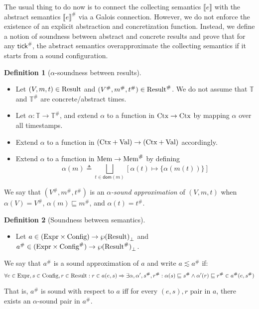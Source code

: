 \documentclass{article}
\theoremstyle{definition}
\newtheorem{definition}{Definition}[section]
\newcommand*{\A}[1]{{#1}^{\#}}
\newcommand*{\Expr}{\text{Expr}}
\newcommand*{\Time}{\mathbb{T}}
\newcommand*{\ATime}{\A{\Time}}
\newcommand*{\Ctx}[1]{\text{Ctx}\vphantom{#1}}
\newcommand*{\Value}[1]{\text{Val}\vphantom{#1}}
\newcommand*{\Mem}[1]{\text{Mem}\vphantom{#1}}
\newcommand*{\mem}{m}
\newcommand*{\AMem}[1]{\A{\text{Mem}}\vphantom{#1}}
\newcommand*{\Config}[1]{\text{Config}\vphantom{#1}}
\newcommand*{\AConfig}[1]{\A{\text{Config}}\vphantom{#1}}
\newcommand*{\Result}[1]{\text{Result}\vphantom{#1}}
\newcommand*{\AResult}[1]{\A{\text{Result}}\vphantom{#1}}
\newcommand*{\sembracket}[1]{\lBrack{#1}\rBrack}
\newcommand*{\tick}{\mathsf{tick}}
\begin{document}
The usual thing to do now is to connect the collecting semantics $\sembracket{e}$ with the abstract semantics $\A{\sembracket{e}}$ via a Galois connection.
However, we do not enforce the existence of an explicit abstraction and concretization function.
Instead, we define a notion of soundness between abstract and concrete results and prove that for any $\A{\tick}$, the abstract semantics overapproximate the collecting semantics if it starts from a sound configuration.

\begin{definition}[$\alpha$-soundness between results]
  $\:$

  \begin{itemize}
    \item Let $(V,\mem,t)\in\Result{\Time}$ and $(\A{V},\A\mem,\A{t})\in\AResult{\ATime}$. We do not assume that $\Time$ and $\ATime$ are concrete/abstract times.
    \item Let $\alpha:\Time\rightarrow\ATime$, and extend $\alpha$ to a function in $\Ctx{\Time}\rightarrow\Ctx{\ATime}$ by mapping $\alpha$ over all timestamps.
    \item Extend $\alpha$ to a function in $(\Ctx{\Time}+\Value{\Time})\rightarrow(\Ctx{\ATime}+\Value{\ATime})$ accordingly.
    \item Extend $\alpha$ to a function in $\Mem{\Time}\rightarrow\AMem{\ATime}$ by defining
          \[\alpha(\mem)\triangleq\bigsqcup_{t\in\mathsf{dom}(\mem)}[\alpha(t)\mapsto\{\alpha(\mem(t))\}]\]
  \end{itemize}

  We say that $(\A{V},\A\mem,\A{t})$ is an \emph{$\alpha$-sound approximation} of $(V,\mem,t)$ when $\alpha(V)=\A{V}$, $\alpha(\mem)\sqsubseteq\A\mem$, and $\alpha(t)=\A{t}$.
\end{definition}

\begin{definition}[Soundness between semantics]
  $\:$

  \begin{itemize}
    \item Let $a\in(\Expr\times\Config{\Time})\rightarrow{\wp(\Result{\Time})}_{\bot}$ and $\A{a}\in(\Expr\times\AConfig{\ATime})\rightarrow{\wp(\AResult{\ATime})}_{\bot}$.
  \end{itemize}

  We say that $\A{a}$ is a sound approximation of $a$ and write $a\lesssim\A{a}$ if:
  \[
    \forall e\in\Expr,s\in\Config{\Time},r\in\Result{\Time}:r\in a(e,s)\Rightarrow\exists\alpha,\alpha',\A{s},\A{r}:\alpha(s)\sqsubseteq\A{s}\wedge\alpha'(r)\sqsubseteq\A{r}\in\A{a}(e,\A{s})
  \]

  That is, $\A{a}$ is sound with respect to $a$ iff for every $(e,s), r$ pair in $a$, there exists an $\alpha$-sound pair in $\A{a}$.
\end{definition}
\end{document}
